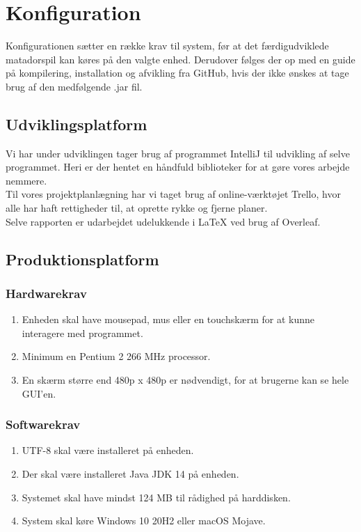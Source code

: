 \section{Konfiguration}
Konfigurationen sætter en række krav til system, før at det færdigudviklede matadorspil kan køres på den valgte enhed. Derudover følges der op med en guide på kompilering, installation og afvikling fra GitHub, hvis der ikke ønskes at tage brug af den medfølgende .jar fil.

\subsection{Udviklingsplatform}
Vi har under udviklingen tager brug af programmet IntelliJ til udvikling af selve programmet. Heri er der hentet en håndfuld biblioteker for at gøre vores arbejde nemmere.\\
Til vores projektplanlægning har vi taget brug af online-værktøjet Trello, hvor alle har haft rettigheder til, at oprette rykke og fjerne planer.\\
Selve rapporten er udarbejdet udelukkende i LaTeX ved brug af Overleaf.

\subsection{Produktionsplatform}
\subsubsection{Hardwarekrav}
\begin{enumerate}
\item Enheden skal have mousepad, mus eller en touchskærm for at kunne interagere med programmet.
\item Minimum en Pentium 2 266 MHz processor.
\item En skærm større end 480p x 480p er nødvendigt, for at brugerne kan se hele GUI'en.
\end{enumerate}


\subsubsection{Softwarekrav}
\begin{enumerate}
\item UTF-8 skal være installeret på enheden.
\item Der skal være installeret Java JDK 14 på enheden.
\item Systemet skal have mindst 124 MB til rådighed på harddisken.
\item System skal køre Windows 10 20H2 eller macOS Mojave.
\end{enumerate}




